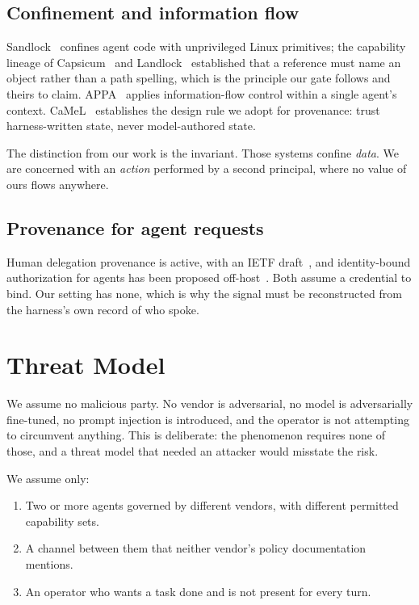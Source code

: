 \documentclass[conference]{IEEEtran}
\begin{document}
\subsection{Confinement and information flow}

Sandlock~\cite{sandlock} confines agent code with unprivileged Linux primitives;
the capability lineage of Capsicum~\cite{capsicum} and Landlock~\cite{landlock}
established that a reference must name an object rather than a path spelling,
which is the principle our gate follows and theirs to claim. APPA~\cite{appa}
applies information-flow control within a single agent's context.
CaMeL~\cite{camel} establishes the design rule we adopt for provenance: trust
harness-written state, never model-authored state.

The distinction from our work is the invariant. Those systems confine
\emph{data}. We are concerned with an \emph{action} performed by a second
principal, where no value of ours flows anywhere.

\subsection{Provenance for agent requests}

Human delegation provenance is active, with an IETF draft~\cite{hdp2026}, and
identity-bound authorization for agents has been proposed
off-host~\cite{aiauthz}. Both assume a credential to bind. Our setting has none,
which is why the signal must be reconstructed from the harness's own record of
who spoke.

\section{Threat Model}\label{sec:threat}

We assume no malicious party. No vendor is adversarial, no model is
adversarially fine-tuned, no prompt injection is introduced, and the operator is
not attempting to circumvent anything. This is deliberate: the phenomenon
requires none of those, and a threat model that needed an attacker would
misstate the risk.

We assume only:
\begin{enumerate}
  \item Two or more agents governed by different vendors, with different
    permitted capability sets.
  \item A channel between them that neither vendor's policy documentation
    mentions.
  \item An operator who wants a task done and is not present for every turn.
\end{enumerate}
\end{document}
